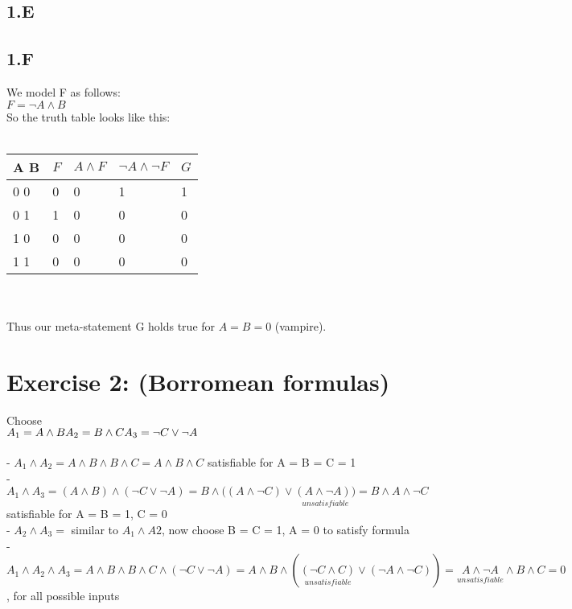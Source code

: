 \documentclass[12pt]{article}
\begin{document}
\subsection*{1.E}

\subsection*{1.F}

We model F as follows:\\
$F = \neg A \land B$ \\
So the truth table looks like this:\\\\
\begin{tabular}{  l | l | l | l | l}
	A B & $F$ & $A \land F $ & $\neg A \land \neg F$ & $G$ \\ \hline
	0 0 & 0 & 0 & 1 & 1 \\
	0 1 & 1 & 0 & 0 & 0 \\
	1 0 & 0 & 0 & 0 & 0 \\
	1 1 & 0 & 0 & 0 & 0 \\
\end{tabular} \\\\
Thus our meta-statement G holds true for $A=B=0$ (vampire).


\section*{Exercise 2: (Borromean formulas)}

Choose \\
$ 
A_1 = A \land B \\
A_2 = B \land C \\
A_3 = \neg C \lor \neg A 
$ \\ \\
- $
	A_1 \land A_2 = A \land B \land B \land C = A \land B \land C $ 
	satisfiable for A = B = C = 1 \\
- $	A_1 \land A_3 = (A \land B) \land (\neg C \lor \neg A) = B \land ( (A \land \neg C) \lor \underset{unsatisfiable}{(A \land \neg A)) } = B \land A \land \neg C
	$ \\ satisfiable for A = B = 1, C = 0 \\
- $A_2 \land A_3 =$ similar to $A_1 \land A2
$, now choose B = C = 1, A = 0 to satisfy formula \\
- $A_1 \land A_2 \land A_3 = A \land B \land B \land C \land (\neg C \lor \neg A) = A \land B \land (\underset{unsatisfiable}{(\neg C \land C)}\lor(\neg A \land \neg C)) = \underset{unsatisfiable}{A \land \neg A} \land B \land C = 0
$ , for all possible inputs \\
\end{document}
